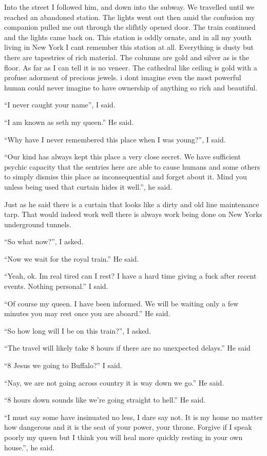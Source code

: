 Into the street I followed him, and down into the subway. We travelled until we reached an abandoned station. The lights went out then amid the confusion my companion pulled me out through the slifhtly opened door. The train continued and the lights came back on. This station is oddly ornate, and in all my youth living in New York I cant remember this station at all. Everything is dusty but there are tapestries of rich material. The columns are gold and silver as is the floor. As far as I can tell it is no veneer. The cathedral like ceiling is gold with a profuse adorment of precious jewels. i dont imagine even the most powerful human could never imagine to have ownership of anything so rich and beautiful.

``I never caught your name'', I said.

``I am known as seth my queen.'' He said.

``Why have I never remembered this place when I was young?'', I said.

``Our kind has always kept this place a very close secret. We have sufficient psychic capacity that the sentries here are able to cause humans and some others to simply dismiss this place as inconsequential and forget about it. Mind you unless being used that curtain hides it well.'', he said.

Just as he said there is a curtain that looks like a dirty and old line maintenance tarp. That would indeed work well there is always work being done on New Yorks underground tunnels.

``So what now?'', I asked.

``Now we wait for the royal train.'' He said.

``Yeah, ok. Im real tired can I rest? I have a hard time giving a fuck after recent events. Nothing personal.'' I said.

``Of course my queen. I have been informed. We will be waiting only a few minutes you may rest once you are aboard.'' He said.

``So how long will I be on this train?'', I asked.

``The travel will likely take 8 hours if there are no unexpected delays.'' He said

``8 Jesus we going to Buffalo?'' I said.

``Nay, we are not going across country it is way down we go.'' He said.

``8 hours down sounds like we're going straight to hell.'' He said.

``I must say some have insinuated no less, I dare say not. It is my home no matter how dangerous and it is the seat of your power, your throne. Forgive if I speak poorly my queen but I think you will heal more quickly resting in your own house.'', he said.

